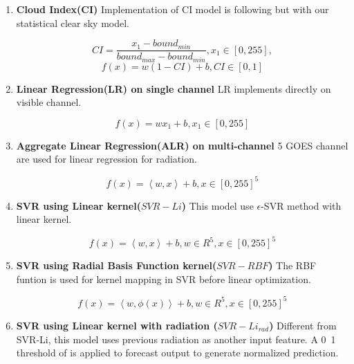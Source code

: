 \documentclass[conference]{IEEEtran}
\begin{document}
 
\begin{enumerate}%
\item \textbf{Cloud Index(CI)} Implementation of CI model is
following \cite{perez2002new} but with our statistical clear sky model.

\begin{equation}
CI=\frac{x_{1}-bound_{min} }{bound_{max}-bound_{min}},x_{1}\in[0,255],
\end{equation}
\begin{equation}
f(x)=w(1-CI)+b,CI \in
[0,1]
\end{equation}


\item \textbf{Linear Regression(LR) on single channel}   LR implements directly
on visible channel.

\begin{equation}
f(x)=wx_{1}+b,x_{1}\in[0,255]
\end{equation}
 
\item \textbf{Aggregate Linear Regression(ALR) on multi-channel} 5 GOES channel
are used for linear regression for radiation. 

\begin{equation}
f(x)=\left \langle w,x \right \rangle+b,x\in[0,255]^{5}
\end{equation}
 

\item \textbf{SVR using Linear kernel($SVR-Li$)} This model
use $\epsilon$-SVR method with linear kernel.

\begin{equation}
f(x)=\left \langle w,x \right \rangle + b, w \in R^{5},x \in [0,255]^{5}
\end{equation}


\item \textbf{SVR using Radial Basis Function kernel($SVR-RBF$)} The RBF funtion
is used for kernel mapping in SVR before linear optimization.

\begin{equation}
f(x)=\left \langle w,\phi(x) \right \rangle + b ,w \in R^{5},x \in [0,255]^{5}
\end{equation}

\item \textbf{SVR using Linear kernel with radiation ($SVR-Li_{rad}$)}
Different from SVR-Li, this model uses previous radiation as another input feature.
A 0~1 threshold of is applied to forecast output to generate normalized
prediction.


\end{enumerate}
\end{document}

